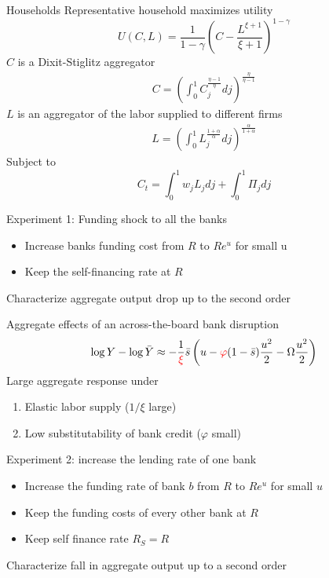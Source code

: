 \documentclass[english,xcolor=svgnames]{beamer}
\begin{document}
\begin{frame}{Households}
Representative household maximizes utility
$$U(C,L) = \frac{1}{1-\gamma} \left(C   - \frac{L^{\xi + 1}}{\xi  + 1}\right)^{1-\gamma}$$
$C$ is a Dixit-Stiglitz aggregator
\begin{align*}
C = \left(\int_0^1 C_{j}^{\frac{\eta-1}{\eta}} dj\right)^{\frac{\eta}{\eta-1}} 
\end{align*}
$L$ is an aggregator of the labor supplied to different firms
\begin{align*}
L = \left(\int_0^1 L_{j}^{\frac{1+\alpha}{\alpha}} dj\right)^{\frac{\alpha}{1+\alpha}} 
\end{align*}
Subject to
$$C_t = \int_0^1 w_j L_j  dj + \int_0^1 \Pi_{j} dj$$
\end{frame}
%
%
%
%



\begin{frame}{Experiment 1: Funding shock to all the banks}
\begin{itemize}
\item Increase banks funding cost from $R$ to $Re^u$ for small u
\item Keep the self-financing rate at $R$
\end{itemize}
Characterize aggregate output drop up to the second order
\end{frame}


\begin{frame}{Aggregate effects of an across-the-board bank disruption}
$$\log Y - \log \bar{Y} \approx - \frac{1}{{\color{red}{\xi}}}  \bar{s}  \left(u - {\color{red}{\varphi}} (1-\bar{s}) \frac{u^2}{2} - \Omega \frac{u^2}{2}\right)$$
Large aggregate response under
\begin{enumerate}
\item Elastic labor supply  ($1/\xi$ large)
\item Low substitutability of bank credit ($\varphi$ small)
\end{enumerate}
\end{frame}


\begin{frame}{Experiment 2: increase the lending rate of one bank}
\begin{itemize}
\item Increase the funding rate of bank $b$ from $R$ to $Re^u$ for small $u$
\item Keep the funding costs of every other bank at $R$
\item Keep self finance rate $R_S = R$
\end{itemize}
Characterize fall in aggregate output up to a second order
\end{frame}
\end{document}

